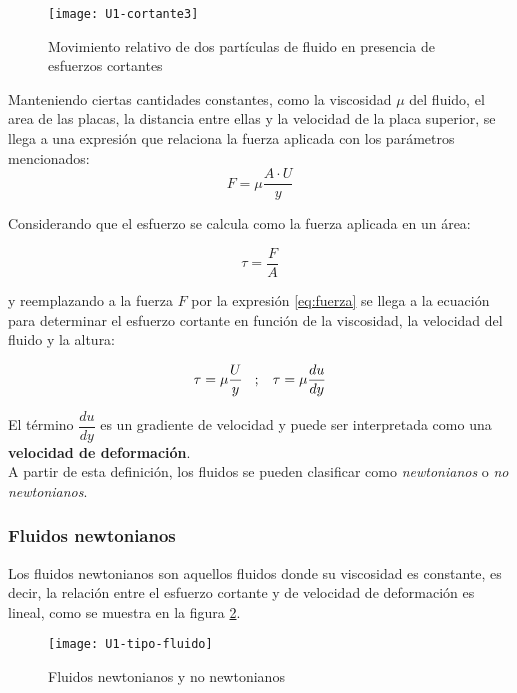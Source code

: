 \begin{figure}[H]
	\centering
	\texttt{[image: U1-cortante3]}
	\caption{Movimiento relativo de dos partículas de fluido en presencia de esfuerzos cortantes}
	\label{fig:fluido-placas-paralelas}
 \end{figure}

Manteniendo ciertas cantidades constantes, como la viscosidad $\mu$ del fluido, el area de las placas, la distancia entre ellas y la velocidad de la placa superior, se llega a una expresión que relaciona la fuerza aplicada con los parámetros mencionados:
\begin{equation}
	F = \mu \dfrac{A \cdot U}{y}
	\label{eq:fuerza}
\end{equation}

Considerando que el esfuerzo se calcula como la fuerza aplicada en un área:

\begin{equation*}
	\tau = \dfrac{F}{A}
	\label{eq:esfuerzo}
\end{equation*}

y reemplazando a la fuerza $F$ por la expresión \ref{eq:fuerza} se llega a la ecuación para determinar el esfuerzo cortante en función de la viscosidad, la velocidad del fluido y la altura:

\begin{equation}
	\tau = \mu \dfrac{U}{y} \hspace{.3cm};\hspace{.3cm} \tau = \mu \dfrac{du}{dy}
\end{equation}

El término $\dfrac{du}{dy}$ es un gradiente de velocidad y puede ser interpretada como una \textbf{velocidad de deformación}.\\ 


A partir de esta definición, los fluidos se pueden clasificar como \textit{newtonianos} o \textit{no newtonianos}.

\subsubsection{Fluidos newtonianos}

Los fluidos newtonianos son aquellos fluidos donde su viscosidad es constante, es decir, la relación entre el esfuerzo cortante y de velocidad de deformación es lineal, como se muestra en la figura \ref{diag:fluido-newtoniano}.



\begin{figure}[H]
	\centering
	\texttt{[image: U1-tipo-fluido]}
	\caption{Fluidos newtonianos y no newtonianos}
	\label{diag:fluido-newtoniano}
\end{figure}


